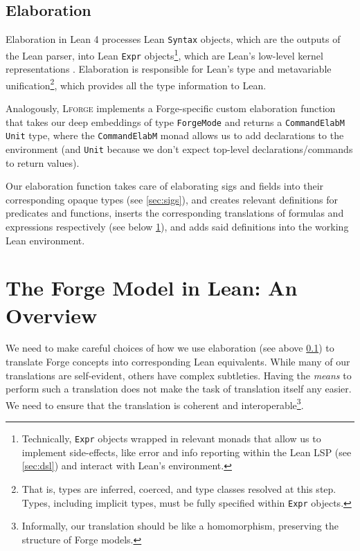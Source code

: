 \subsection{Elaboration}\label{sec:elaboration}

Elaboration in Lean 4 processes Lean \texttt{Syntax} objects, which are the outputs of the Lean parser, into Lean \texttt{Expr} objects\footnote{Technically, \texttt{Expr} objects wrapped in relevant monads that allow us to implement side-effects, like error and info reporting within the Lean LSP (see \cref{sec:dsl}) and interact with Lean's environment.}, which are Lean's low-level kernel representations \cite{metaprogramming}. Elaboration is responsible for Lean's type and metavariable unification\footnote{That is, types are inferred, coerced, and type classes resolved at this step. Types, including implicit types, must be fully specified within \texttt{Expr} objects.}, which provides all the type information to Lean. 

Analogously, \textsc{Lforge} implements a Forge-specific custom elaboration function that takes our deep embeddings of type \texttt{ForgeMode} and returns a \texttt{CommandElabM Unit} type, where the \texttt{CommandElabM} monad allows us to add declarations to the environment (and \texttt{Unit} because we don't expect top-level declarations/commands to return values). 

Our elaboration function takes care of elaborating sigs and fields into their corresponding opaque types (see \cref{sec:sigs}), and creates relevant definitions for predicates and functions, inserts the corresponding translations of formulas and expressions respectively (see below \cref{sec:forge-model}), and adds said definitions into the working Lean environment.

\newpage
\section{The Forge Model in Lean: An Overview}\label{sec:forge-model}
We need to make careful choices of how we use elaboration (see above \cref{sec:elaboration}) to translate Forge concepts into corresponding Lean equivalents. While many of our translations are self-evident, others have complex subtleties. Having the \emph{means} to perform such a translation does not make the task of translation itself any easier. We need to ensure that the translation is coherent and interoperable\footnote{Informally, our translation should be like a homomorphism, preserving the structure of Forge models.}. 

